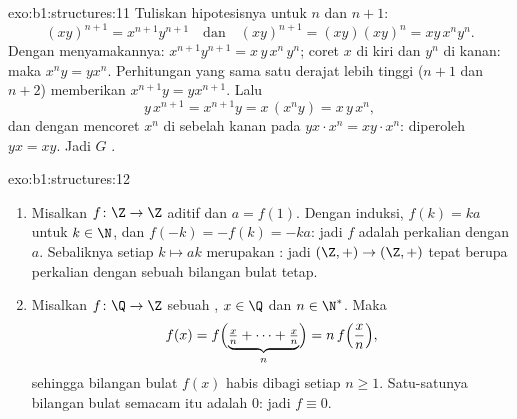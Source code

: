 \begin{solution}{exo:b1:structures:11}
Tuliskan hipotesisnya untuk $n$ dan $n+1$:
\[
(xy)^{n+1} = x^{n+1} y^{n+1}
\quad\text{dan}\quad
(xy)^{n+1} = (xy)(xy)^n = xy\,x^n y^n .
\]
Dengan menyamakannya: $x^{n+1} y^{n+1} = x\,y\,x^n\,y^n$; coret $x$ di kiri
dan $y^n$ di kanan: maka $x^n y = y x^n$. Perhitungan yang sama satu
derajat lebih tinggi ($n+1$ dan $n+2$) memberikan $x^{n+1} y = y x^{n+1}$. Lalu
\[
y\,x^{n+1} = x^{n+1} y = x\,(x^n y) = x\,y\,x^n ,
\]
dan dengan mencoret $x^n$ di sebelah kanan pada $y x \cdot x^n = x y \cdot x^n$:
diperoleh $yx = xy$. Jadi $G$ .
\end{solution}

\begin{solution}{exo:b1:structures:12}
\begin{enumerate}
  \item Misalkan $f \colon \Z \to \Z$ aditif dan $a = f(1)$. Dengan
        induksi, $f(k) = ka$ untuk $k \in \N$, dan $f(-k) = -f(k) =
        -ka$: jadi $f$ adalah perkalian dengan $a$. Sebaliknya
        setiap  $k \mapsto ak$ merupakan : jadi 
        $(\Z,+) \to (\Z,+)$ tepat berupa perkalian dengan sebuah
        bilangan bulat tetap.
  \item Misalkan $f \colon \Q \to \Z$ sebuah , $x \in \Q$ dan
        $n \in \N^*$. Maka
        \[
        f(x) = f\Bigl(\underbrace{\tfrac xn + \dots +
        \tfrac xn}_{n}\Bigr) = n\,f\Bigl(\frac xn\Bigr) ,
        \]
        sehingga bilangan bulat $f(x)$ habis dibagi setiap $n \geq 1$.
        Satu-satunya bilangan bulat semacam itu adalah $0$: jadi $f \equiv 0$.
\end{enumerate}
\end{solution}

